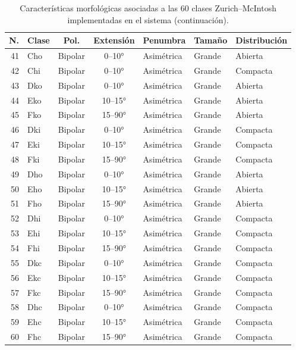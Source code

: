 \begin{appendices}
\begin{table}[H]
\centering
\caption*{Características morfológicas asociadas a las 60 clases Zurich--McIntosh implementadas en el sistema (continuación).}
\scriptsize
\setlength{\tabcolsep}{3pt}
\renewcommand{\arraystretch}{1.04}
\begin{tabular}{r l c c l l l}
\toprule
\textbf{N.} & \textbf{Clase} & \textbf{Pol.} & \textbf{Extensión} & \textbf{Penumbra} & \textbf{Tamaño} & \textbf{Distribución} \\
\midrule
41 & Cho & Bipolar & 0--10° & Asimétrica & Grande & Abierta \\
42 & Chi & Bipolar & 0--10° & Asimétrica & Grande & Compacta \\
43 & Dko & Bipolar & 0--10° & Asimétrica & Grande & Abierta \\
44 & Eko & Bipolar & 10--15° & Asimétrica & Grande & Abierta \\
45 & Fko & Bipolar & 15--90° & Asimétrica & Grande & Abierta \\
46 & Dki & Bipolar & 0--10° & Asimétrica & Grande & Compacta \\
47 & Eki & Bipolar & 10--15° & Asimétrica & Grande & Compacta \\
48 & Fki & Bipolar & 15--90° & Asimétrica & Grande & Compacta \\
49 & Dho & Bipolar & 0--10° & Asimétrica & Grande & Abierta \\
50 & Eho & Bipolar & 10--15° & Asimétrica & Grande & Abierta \\
51 & Fho & Bipolar & 15--90° & Asimétrica & Grande & Abierta \\
52 & Dhi & Bipolar & 0--10° & Asimétrica & Grande & Compacta \\
53 & Ehi & Bipolar & 10--15° & Asimétrica & Grande & Compacta \\
54 & Fhi & Bipolar & 15--90° & Asimétrica & Grande & Compacta \\
55 & Dkc & Bipolar & 0--10° & Asimétrica & Grande & Compacta \\
56 & Ekc & Bipolar & 10--15° & Asimétrica & Grande & Compacta \\
57 & Fkc & Bipolar & 15--90° & Asimétrica & Grande & Compacta \\
58 & Dhc & Bipolar & 0--10° & Asimétrica & Grande & Compacta \\
59 & Ehc & Bipolar & 10--15° & Asimétrica & Grande & Compacta \\
60 & Fhc & Bipolar & 15--90° & Asimétrica & Grande & Compacta \\
\bottomrule
\end{tabular}
\end{table}


\end{appendices}
